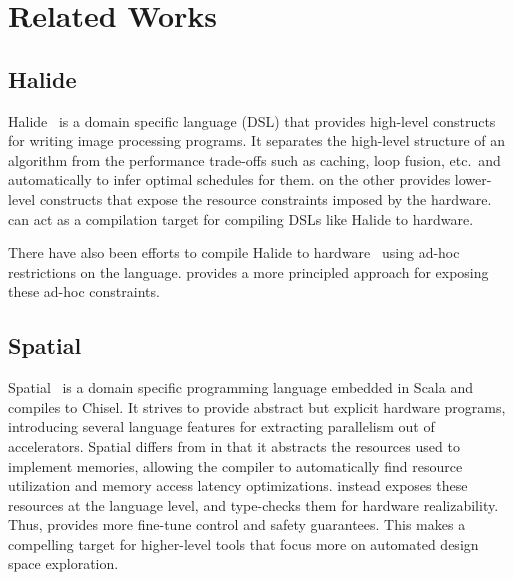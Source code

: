 \documentclass[acmsmall,review,anonymous]{acmart}\settopmatter{printfolios=true,printccs=false,printacmref=false}
\begin{document}
\section{Related Works}

\subsection{Halide}
Halide~\cite{halide} is a domain specific language (DSL) that provides high-level constructs for writing image processing
programs. It separates the high-level structure of an algorithm from the
performance trade-offs such as caching, loop fusion, etc.\ and automatically to
infer optimal schedules for them. \sys{} on the other provides lower-level constructs
that expose the resource constraints imposed by the hardware. \sys{} can act as a
compilation target for compiling DSLs like Halide to hardware.

There have also been efforts to compile Halide to hardware~\cite{halide-hls} using ad-hoc
restrictions on the language. \sys{} provides a more principled approach for
exposing these ad-hoc constraints.

\subsection{Spatial}
Spatial~\cite{spatial} is a domain specific programming language embedded in Scala
and compiles to Chisel. It strives to provide abstract but explicit hardware programs,
introducing several language features for extracting parallelism out of accelerators. Spatial
differs from \sys{} in that it abstracts the resources used to implement memories, allowing
the compiler to automatically find resource utilization and memory access latency optimizations.
\sys{} instead exposes these resources at the language level, and type-checks them for hardware
realizability. Thus, \sys{} provides more fine-tune control and safety guarantees. This makes
\sys{} a compelling target for higher-level tools that focus more on automated design space
exploration.

\end{document}
